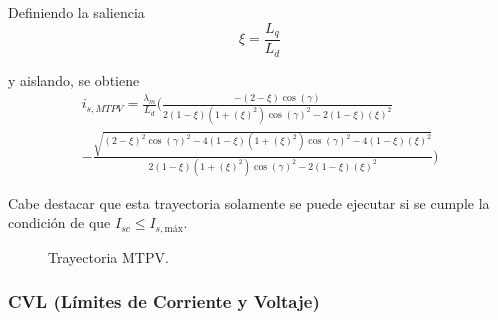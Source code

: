 Definiendo la saliencia  
\begin{equation}
	\xi = \frac{L_q}{L_d}
\end{equation}

y aislando, se obtiene
\begin{equation}
\begin{split}
i_{s,MTPV} = \frac{\lambda_m}{L_d} ( \frac{-(2 - \xi) \cos(\gamma)}{2(1 - \xi)(1 + (\xi)^2) \cos(\gamma)^2 - 2(1 - \xi) (\xi)^2}\\
-\frac{\sqrt{(2 - \xi)^2 \cos(\gamma)^2 - 4(1 - \xi)(1 + (\xi)^2) \cos(\gamma)^2 - 4(1 - \xi) (\xi)^2}}{2(1 - \xi)(1 + (\xi)^2) \cos(\gamma)^2 - 2(1 - \xi) (\xi)^2} )
\end{split}
\end{equation}




Cabe destacar que esta trayectoria solamente se puede ejecutar si se cumple la condición de que $I_{sc} \leq I_{s,\text{máx}}$.


\begin{figure}[H]
  \centering
  \caption{Trayectoria MTPV.}
\end{figure}



\subsubsection{CVL (Límites de Corriente y Voltaje)}

